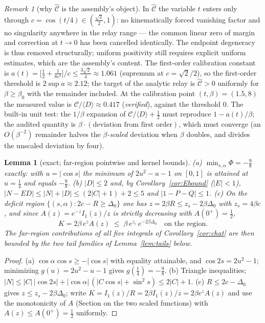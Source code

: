 \documentclass[11pt]{article}
\newtheorem{lemma}[theorem]{Lemma}
\theoremstyle{remark}
\newtheorem{remark}[theorem]{Remark}
\begin{document}
\begin{remark}[why $\widehat{\mathcal C}$ is the assembly's object]
\label{rem:sfree}
In $\widehat{\mathcal C}$ the variable $t$ enters only through
$c=\cos(t/4)\in(\tfrac{\sqrt2}{2},1)$: no kinematically forced
vanishing factor and no singularity anywhere in the relay range ---
the common linear zero of margin and correction at $t\to0$ has been
cancelled identically. The endpoint degeneracy is thus removed
structurally; uniform positivity still requires explicit uniform
estimates, which are the assembly's content. The first-order calibration
constant is
$a(t)=\bigl[\tfrac12+\tfrac1{8c^2}\bigr]/c\le\tfrac{3\sqrt2}{4}
\approx1.061$ (supremum at $c=\sqrt2/2$), so the first-order
threshold is $2\sup a\approx2.12$; the target of the analytic relay
is $\widehat{\mathcal C}>0$ uniformly for $\beta\ge\beta_0$ with the
remainder included. At the calibration point $(t,\beta)=(1.5,8)$ the measured
value is $\mathcal C/\langle D\rangle\approx0.417$
(\emph{verified}), against the threshold $0$. The built-in unit
test: the $1/\beta$ expansion of
$\mathcal C/\langle D\rangle+\tfrac12$ must reproduce
$1-a(t)/\beta$; the audited quantity is $\beta\cdot(\text{deviation
from first order})$, which must converge (an $O(\beta^{-2})$
remainder halves the \emph{$\beta$-scaled} deviation when $\beta$
doubles, and divides the unscaled deviation by four).
\end{remark}

\begin{lemma}[exact; far-region pointwise and kernel bounds]
\label{lem:regionIII}
\textup{(a)} $\min_{s,\alpha}\Phi
=-\tfrac98$ exactly: with $u=|\cos s|$ the minimum of
$2u^2-u-1$ on $[0,1]$ is attained at $u=\tfrac14$ and equals
$-\tfrac98$. \textup{(b)} $|D|\le2$ and, by
Corollary~\ref{cor:Ebound} \textup{(}$|E|<1$\textup{)},
$|N-ED|\le|N|+|D|\le(2|C|+1)+2\le5$ and
$|1-P-Q|\le1$. \textup{(c)} On the deficit region
$\{(s,\alpha):2c-R\ge\Delta_0\}$ one has $z=2\beta R\le
z_s-2\beta\Delta_0$ with $z_s=4\beta c$, and since
$A(z)=e^{-z}I_1(z)/z$ is strictly decreasing with
$A(0^+)=\tfrac12$,
\[
K=2\beta\,e^{z}A(z)\;\le\;\beta\,
e^{z_s}\,e^{-2\beta\Delta_0}
\quad\text{on the region.}
\]
The far-region contributions of all five integrals of
Corollary~\ref{cor:chat} are then bounded by the two tail families
of Lemma~\ref{lem:tails} below.
\end{lemma}

\begin{proof}
(a) $\cos\alpha\cos s\ge-|\cos s|$ with equality attainable, and
$\cos2s=2u^2-1$; minimizing $g(u)=2u^2-u-1$ gives $g(\tfrac14)
=-\tfrac98$. (b) Triangle inequalities; $|N|\le|C|\,|\cos2s|
+|\cos\alpha|\,(|C\cos s|+\sin^2s)\le2|C|+1$. (c) $R\le2c-\Delta_0$
gives $z\le z_s-2\beta\Delta_0$; write $K=I_1(z)/R=2\beta I_1(z)/z
=2\beta e^zA(z)$ and use the monotonicity of $A$ (Section on the two
scaled functions) with $A(z)\le A(0^+)=\tfrac12$ uniformly.
\end{proof}
\end{document}
